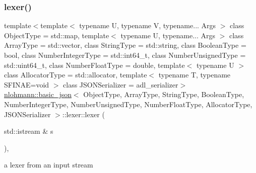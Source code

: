 \subsubsection{\texorpdfstring{lexer()}{lexer()}\hspace{0.1cm}{\footnotesize\ttfamily [2/4]}}
{\footnotesize\ttfamily template$<$template$<$ typename U, typename V, typename... Args $>$ class Object\+Type = std\+::map, template$<$ typename U, typename... Args $>$ class Array\+Type = std\+::vector, class String\+Type  = std\+::string, class Boolean\+Type  = bool, class Number\+Integer\+Type  = std\+::int64\+\_\+t, class Number\+Unsigned\+Type  = std\+::uint64\+\_\+t, class Number\+Float\+Type  = double, template$<$ typename U $>$ class Allocator\+Type = std\+::allocator, template$<$ typename T, typename S\+F\+I\+N\+A\+E=void $>$ class J\+S\+O\+N\+Serializer = adl\+\_\+serializer$>$ \\
\hyperlink{classnlohmann_1_1basic__json}{nlohmann\+::basic\+\_\+json}$<$ Object\+Type, Array\+Type, String\+Type, Boolean\+Type, Number\+Integer\+Type, Number\+Unsigned\+Type, Number\+Float\+Type, Allocator\+Type, J\+S\+O\+N\+Serializer $>$\+::lexer\+::lexer (\begin{DoxyParamCaption}\item[{std\+::istream \&}]{s }\end{DoxyParamCaption})\hspace{0.3cm}{\ttfamily [inline]}, {\ttfamily [explicit]}}



a lexer from an input stream 

\mbox{\label{classnlohmann_1_1basic__json_1_1lexer_a45c85aa63e95ac8640449e6643c61414}} 
